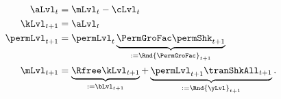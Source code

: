   \begin{equation}\label{eq:DBCparts} %
    \begin{aligned}
      \aLvl_{t}     & = \mLvl_{t}-\cLvl_{t}  \\
      \kLvl_{t+1}   & = \aLvl_{t} \notag \\
      \permLvl_{t+1}  & = \permLvl_{t} \underbrace{\PermGroFac\permShk_{t+1}}_{:= \Rnd{\PermGroFac}_{t+1}} \notag \\
      \mLvl_{t+1}  & =   \underbrace{\Rfree \kLvl_{t+1}}_{:= \bLvl_{t+1}}  +\underbrace{\permLvl_{t+1}\tranShkAll_{t+1}}_{:= \Rnd{\yLvl}_{t+1}}. \notag
    \end{aligned}
  \end{equation}
